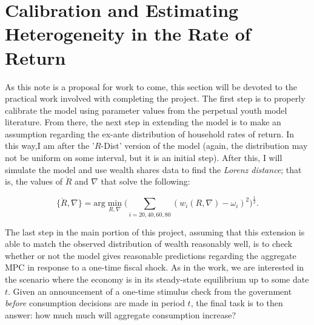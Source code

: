 \documentclass[\econtexRoot/Preproposal]{subfiles}
\begin{document}
\hypertarget{CalEst}{}
\onlyinsubfile{\setcounter{section}{3}}
\section{Calibration and Estimating Heterogeneity in the Rate of Return}\notinsubfile{\label{sec:sim}}


\par As this note is a proposal for work to come, this section will be devoted to the practical work involved with completing the project. The first step is to properly calibrate the model using parameter values from the perpetual youth model literature. From there, the next step in extending the model is to make an assumption regarding the ex-ante distribution of household rates of return. In this way,I am after the '$R$-Dist' version of the model (again, the distribution may not be uniform on some interval, but it is an initial step). After this, I will simulate the model and use wealth shares data to find the \textit{Lorenz distance}; that is, the values of $\grave{R}$ and $\nabla$ that solve the following:

$$ \{\grave{R}, \nabla\} = \text{arg}\min_{R, \nabla} \bigg( \sum_{i=20, 40, 60, 80} (w_{i}(R, \nabla)-\omega_i )^{2} \bigg)^{\frac{1}{2}}. $$

\par The last step in the main portion of this project, assuming that this extension is able to match the observed distribution of wealth reasonably well, is to check whether or not the model gives reasonable predictions regarding the aggregate MPC in response to a one-time fiscal shock. As in the \cite{cstw2017} work, we are interested in the scenario where the economy is in its steady-state equilibrium up to some date $t$. Given an announcement of a one-time stimulus check from the government \textit{before} consumption decisions are made in period $t$, the final task is to then answer: how much much will aggregate consumption increase?


\onlyinsubfile{}

\end{document}
